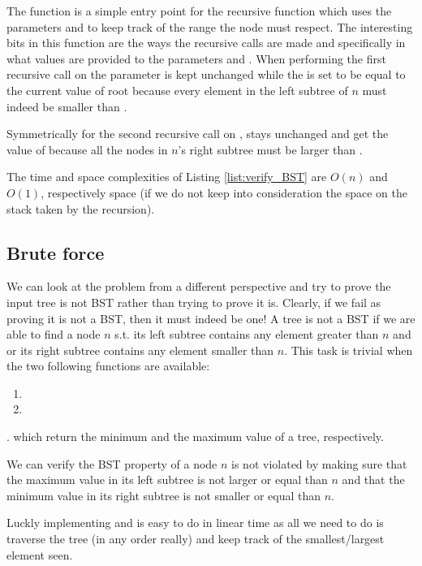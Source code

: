 The function  is a simple entry point for the recursive function  which uses the parameters  and  to keep track of the range the node  must respect. 
The interesting bits in this function are the ways the recursive calls are made and specifically in what values are provided to the parameters  and . 
When performing the first recursive call on  the parameter  is kept unchanged while the  is set to be equal to the current value of root because every element in the left subtree of $n$ must indeed be smaller than .

Symmetrically for the second recursive call on ,  stays unchanged and  get the value of  because all the nodes in $n$'s right subtree must be larger than .

The time and space complexities of Listing \ref{list:verify_BST} are $O(n)$  and $O(1)$, respectively space (if we do not keep into consideration the space on the stack taken by the recursion).

\subsection{Brute force}
We can look at the problem from a different perspective and try to prove the input tree is not  BST rather than trying to prove it is. Clearly, if we fail as proving it is not a BST, then it must indeed be one!
A tree is not a BST if we are able to find a node $n$ s.t. its left subtree contains any element greater than $n$ and or its right subtree contains any element smaller than $n$.
This task is trivial when the two following functions are available:
\begin{enumerate}
	\item {}
	\item {}
\end{enumerate}.
which return the minimum and the maximum value of a tree, respectively.

We can verify the BST property of a node $n$ is not violated by making sure that the maximum value in its left subtree is not larger or equal than $n$ and that the minimum value in its right subtree is not smaller or equal than $n$.

Luckly implementing  and  is easy to do in linear time as all we need to do is traverse the tree (in any order really) and keep track of the smallest/largest element seen. 

